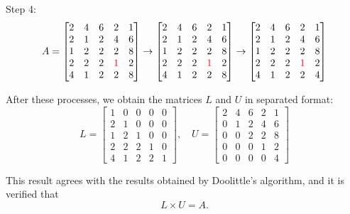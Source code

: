 \documentclass[a4paper,titlepage]{article}
\begin{document}
		Step 4:
		$$
			A = \begin{bmatrix}				
				2 & 4 & 6 & 2 & 1\\
				2 & 1 & 2 & 4 & 6\\
				1 & 2 & 2 & 2 & 8\\
				2 & 2 & 2 & \textcolor{red}{1} & 2\\
				4 & 1 & 2 & 2 & 8
			\end{bmatrix} \rightarrow \begin{bmatrix}				
				2 & 4 & 6 & 2 & 1\\
				2 & 1 & 2 & 4 & 6\\
				1 & 2 & 2 & 2 & 8\\
				2 & 2 & 2 & \textcolor{red}{1} & 2\\
				4 & 1 & 2 & 2 & 8
			\end{bmatrix} \rightarrow \begin{bmatrix}				
				2 & 4 & 6 & 2 & 1\\
				2 & 1 & 2 & 4 & 6\\
				1 & 2 & 2 & 2 & 8\\
				2 & 2 & 2 & \textcolor{red}{1} & 2\\
				4 & 1 & 2 & 2 & 4
			\end{bmatrix}
		$$
		
		After these processes, we obtain the matrices $L$ and $U$ in separated format:
		$$
		L = \begin{bmatrix}
		1 & 0 & 0 & 0 & 0\\
		2 & 1 & 0 & 0 & 0\\
		1 & 2 & 1 & 0 & 0\\
		2 & 2 & 2 & 1 & 0\\
		4 & 1 & 2 & 2 & 1
		\end{bmatrix}, \quad		
		U = \begin{bmatrix}
		2 & 4 & 6 & 2 & 1\\
		0 & 1 & 2 & 4 & 6\\
		0 & 0 & 2 & 2 & 8\\
		0 & 0 & 0 & 1 & 2\\
		0 & 0 & 0 & 0 & 4
		\end{bmatrix}		
		$$
		
		This result agrees with the results obtained by Doolittle's algorithm, and it is verified that 
		$$
			L\times U = A.
		$$
\end{document}
